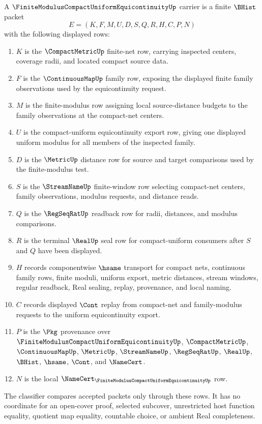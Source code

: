 \begin{definition}
\label{def:finite-modulus-compact-uniform-equicontinuity-carrier}
A $\FiniteModulusCompactUniformEquicontinuityUp$ carrier is a finite $\BHist$ packet
$$
E=(K,F,M,U,D,S,Q,R,H,C,P,N)
$$
with the following displayed rows:
\begin{enumerate}
\item $K$ is the $\CompactMetricUp$ finite-net row, carrying inspected centers, coverage radii, and located compact source data.
\item $F$ is the $\ContinuousMapUp$ family row, exposing the displayed finite family observations used by the equicontinuity request.
\item $M$ is the finite-modulus row assigning local source-distance budgets to the family observations at the compact-net centers.
\item $U$ is the compact-uniform equicontinuity export row, giving one displayed uniform modulus for all members of the inspected family.
\item $D$ is the $\MetricUp$ distance row for source and target comparisons used by the finite-modulus test.
\item $S$ is the $\StreamNameUp$ finite-window row selecting compact-net centers, family observations, modulus requests, and distance reads.
\item $Q$ is the $\RegSeqRatUp$ readback row for radii, distances, and modulus comparisons.
\item $R$ is the terminal $\RealUp$ seal row for compact-uniform consumers after $S$ and $Q$ have been displayed.
\item $H$ records componentwise $\hsame$ transport for compact nets, continuous family rows, finite moduli, uniform export, metric distances, stream windows, regular readback, Real sealing, replay, provenance, and local naming.
\item $C$ records displayed $\Cont$ replay from compact-net and family-modulus requests to the uniform equicontinuity export.
\item $P$ is the $\Pkg$ provenance over $\FiniteModulusCompactUniformEquicontinuityUp$, $\CompactMetricUp$, $\ContinuousMapUp$, $\MetricUp$, $\StreamNameUp$, $\RegSeqRatUp$, $\RealUp$, $\BHist$, $\hsame$, $\Cont$, and $\NameCert$.
\item $N$ is the local $\NameCert_{\FiniteModulusCompactUniformEquicontinuityUp}$ row.
\end{enumerate}
The classifier compares accepted packets only through these rows. It has no coordinate for an open-cover proof, selected subcover, unrestricted host function equality, quotient map equality, countable choice, or ambient Real completeness.
\end{definition}

